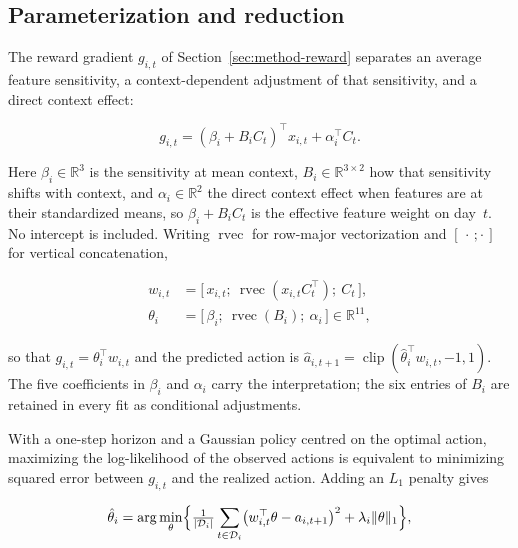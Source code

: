 \documentclass[sigconf,anonymous,review]{acmart}
\begin{document}
\subsection{Parameterization and reduction}
\label{sec:method-reduction}

The reward gradient $g_{i,t}$ of Section~\ref{sec:method-reward}
separates an average feature sensitivity, a context-dependent adjustment
of that sensitivity, and a direct context effect:

\begin{equation}
  g_{i,t} = (\beta_i + B_i C_t)^{\top} x_{i,t} + \alpha_i^{\top} C_t .
\end{equation}

Here $\beta_i \in \mathbb{R}^3$ is the sensitivity at mean context,
$B_i \in \mathbb{R}^{3 \times 2}$ how that sensitivity shifts with
context, and $\alpha_i \in \mathbb{R}^2$ the direct context effect when
features are at their standardized means, so $\beta_i + B_i C_t$ is the
effective feature weight on day~$t$. No intercept is included. Writing
$\operatorname{rvec}$ for row-major vectorization and $[\,\cdot\,;\cdot\,]$
for vertical concatenation,

\begin{equation}
  \begin{aligned}
    w_{i,t} &= \bigl[\, x_{i,t};\ \operatorname{rvec}(x_{i,t} C_t^{\top});\ C_t \,\bigr], \\
    \theta_i &= \bigl[\, \beta_i;\ \operatorname{rvec}(B_i);\ \alpha_i \,\bigr]
      \in \mathbb{R}^{11},
  \end{aligned}
\end{equation}

so that $g_{i,t} = \theta_i^{\top} w_{i,t}$ and the predicted action is
$\hat a_{i,t+1} = \operatorname{clip}(\hat\theta_i^{\top} w_{i,t}, -1, 1)$.
The five coefficients in $\beta_i$ and
$\alpha_i$ carry the interpretation; the six entries of $B_i$ are
retained in every fit as conditional adjustments.

With a one-step horizon and a Gaussian policy centred on the optimal
action, maximizing the log-likelihood of the observed actions is
equivalent to minimizing squared error between $g_{i,t}$ and the realized
action. Adding an $L_1$ penalty gives

\begin{equation}
  \hat\theta_i = \arg\min_{\theta}
  \Bigl\{ \tfrac{1}{|\mathcal{D}_i|}
    \sum_{t \in \mathcal{D}_i}
      \bigl( w_{i,t}^{\top}\theta - a_{i,t+1} \bigr)^2
    + \lambda_i \lVert \theta \rVert_1 \Bigr\},
\end{equation}
\end{document}
